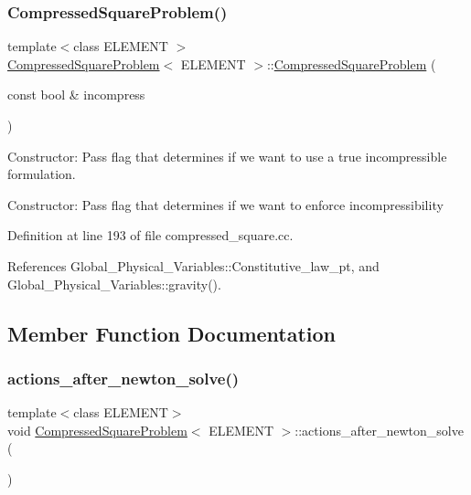 \subsubsection{\texorpdfstring{Compressed\+Square\+Problem()}{CompressedSquareProblem()}}
{\footnotesize\ttfamily template$<$class E\+L\+E\+M\+E\+NT $>$ \\
\hyperlink{classCompressedSquareProblem}{Compressed\+Square\+Problem}$<$ E\+L\+E\+M\+E\+NT $>$\+::\hyperlink{classCompressedSquareProblem}{Compressed\+Square\+Problem} (\begin{DoxyParamCaption}\item[{const bool \&}]{incompress }\end{DoxyParamCaption})}



Constructor\+: Pass flag that determines if we want to use a true incompressible formulation. 

Constructor\+: Pass flag that determines if we want to enforce incompressibility 

Definition at line 193 of file compressed\+\_\+square.\+cc.



References Global\+\_\+\+Physical\+\_\+\+Variables\+::\+Constitutive\+\_\+law\+\_\+pt, and Global\+\_\+\+Physical\+\_\+\+Variables\+::gravity().



\subsection{Member Function Documentation}
\mbox{\label{classCompressedSquareProblem_afef46d13ff7c8b2845e96a84762077dc}} 
\subsubsection{\texorpdfstring{actions\+\_\+after\+\_\+newton\+\_\+solve()}{actions\_after\_newton\_solve()}}
{\footnotesize\ttfamily template$<$class E\+L\+E\+M\+E\+NT$>$ \\
void \hyperlink{classCompressedSquareProblem}{Compressed\+Square\+Problem}$<$ E\+L\+E\+M\+E\+NT $>$\+::actions\+\_\+after\+\_\+newton\+\_\+solve (\begin{DoxyParamCaption}{ }\end{DoxyParamCaption})\hspace{0.3cm}{\ttfamily [inline]}}



